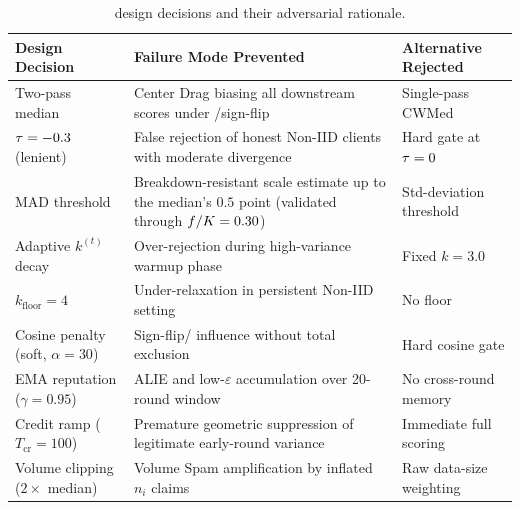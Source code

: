 \documentclass[../main.tex]{subfiles}
\begin{document}
\begin{table}[H]
\centering
\caption{\aegis{} design decisions and their adversarial rationale.}
\label{tab:design_decisions}
\begin{tabularx}{\linewidth}{lXl}
\toprule
\textbf{Design Decision} & \textbf{Failure Mode Prevented} & \textbf{Alternative Rejected} \\
\midrule
Two-pass median & Center Drag biasing all downstream scores under \ipm{}/sign-flip & Single-pass CWMed \\
\addlinespace
$\tau = -0.3$ (lenient) & False rejection of honest Non-IID clients with moderate divergence & Hard gate at $\tau = 0$ \\
\addlinespace
MAD threshold & Breakdown-resistant scale estimate up to the median's $0.5$ point (validated through $f/K = 0.30$) & Std-deviation threshold \\
\addlinespace
Adaptive $k^{(t)}$ decay & Over-rejection during high-variance warmup phase & Fixed $k = 3.0$ \\
\addlinespace
$k_{\text{floor}} = 4$ & Under-relaxation in persistent Non-IID setting & No floor \\
\addlinespace
Cosine penalty (soft, $\alpha = 30$) & Sign-flip/\ipm{} influence without total exclusion & Hard cosine gate \\
\addlinespace
EMA reputation ($\gamma = 0.95$) & ALIE and low-$\varepsilon$ \ipm{} accumulation over 20-round window & No cross-round memory \\
\addlinespace
Credit ramp ($T_{\text{cr}} = 100$) & Premature geometric suppression of legitimate early-round variance & Immediate full scoring \\
\addlinespace
Volume clipping ($2\times$ median) & Volume Spam amplification by inflated $n_i$ claims & Raw data-size weighting \\
\bottomrule
\end{tabularx}
\end{table}
\end{document}
